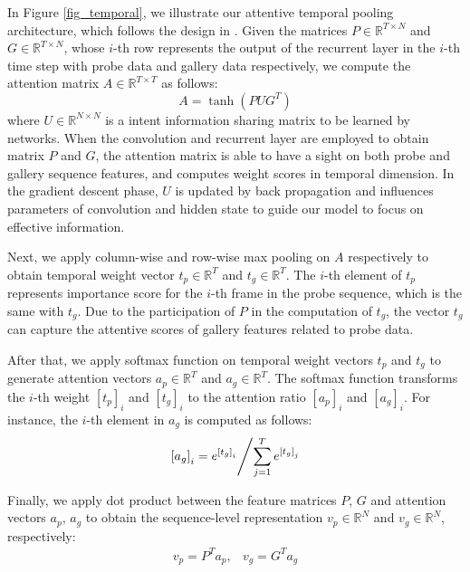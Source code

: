 \documentclass[10pt,twocolumn,letterpaper]{article}
\begin{document}
In Figure \ref{fig_temporal}, we illustrate our attentive temporal pooling architecture, which follows the design in \cite{Santos2016AttentivePN,DBLP:journals/tacl/YinSXZ16}. Given the matrices $	P \in {\mathbb{R}^{T \times N}}$ and $G \in {\mathbb{R}^{T \times N}}$, whose $i$-th row represents the output of the recurrent layer in the $i$-th time step with probe data and gallery data respectively, we compute the attention matrix $A \in {\mathbb{R}^{T \times T}}$ as follows:
\begin{equation}
A = \operatorname{tanh} \left( {PU{G^T}} \right)
\end{equation}
where $U \in {\mathbb{R}^{N \times N}}$ is a intent information sharing matrix to be learned by networks. When the convolution and recurrent layer are employed to obtain matrix $P$ and $G$, the attention matrix is able to have a sight on both probe and gallery sequence features, and computes weight scores in temporal dimension. In the gradient descent phase, $U$ is updated by back propagation and influences parameters of convolution and hidden state to guide our model to focus on effective information.  

Next, we apply column-wise and row-wise max pooling on $A$ respectively to obtain temporal weight vector $t_p \in {\mathbb{R}^{T}}$ and $t_g \in {\mathbb{R}^{T}}$. The $i$-th element of $t_p$ represents importance score for the $i$-th frame in the probe sequence, which is the same with $t_g$. Due to the participation of $P$ in the computation of $t_g$, the vector $t_g$ can capture the attentive scores of gallery features related to probe data.

After that, we apply softmax function on temporal weight vectors $t_p$ and $t_g$ to generate attention vectors $a_p \in {\mathbb{R}^{T}}$ and $a_g \in {\mathbb{R}^{T}}$. The softmax function transforms the $i$-th weight ${\left[ {{t_p}} \right]_i}$ and ${\left[ {{t_g}} \right]_i}$ to the attention ratio ${\left[ {{a_p}} \right]_i}$ and ${\left[ {{a_g}} \right]_i}$. For instance, the $i$-th element in $a_g$ is computed as follows:
\begin{equation}
{\left[ {{a_g}} \right]_i} = {{{e^{{{\left[ {{t_g}} \right]}_i}}}} \mathord{\left/
 {\vphantom {{{e^{{{\left[ {{t_g}} \right]}_i}}}} {\sum\limits_{j = 1}^T {{e^{{{\left[ {{t_g}} \right]}_j}}}} }}} \right.
 \kern-\nulldelimiterspace} {\sum\limits_{j = 1}^T {{e^{{{\left[ {{t_g}} \right]}_j}}}} }}
\end{equation}

Finally, we apply dot product between the feature matrices $P$, $G$ and attention vectors $a_p$, $a_g$ to obtain the sequence-level representation $v_p \in {\mathbb{R}^{N}}$ and $v_g \in {\mathbb{R}^{N}}$, respectively:
\begin{equation}
\begin{array}{*{20}{c}}
{{v_p} = {P^T}{a_p},}&{{v_g} = {G^T}{a_g}}
\end{array}
\end{equation}
\end{document}
